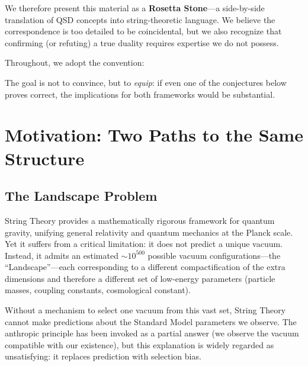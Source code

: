 \documentclass[11pt,a4paper]{article}
\theoremstyle{definition}
\begin{document}
We therefore present this material as a \textbf{Rosetta Stone}---a
side-by-side translation of QSD concepts into string-theoretic language.  We
believe the correspondence is too detailed to be coincidental, but we also
recognize that confirming (or refuting) a true duality requires expertise we do
not possess.

Throughout, we adopt the convention:
\begin{center}
\end{center}

The goal is not to convince, but to \emph{equip}: if even one of the
conjectures below proves correct, the implications for both frameworks would be
substantial.


\section{Motivation: Two Paths to the Same Structure}
\label{sec:motivation}

\subsection{The Landscape Problem}

String Theory provides a mathematically rigorous framework for quantum
gravity, unifying general relativity and quantum mechanics at the Planck
scale.  Yet it suffers from a critical limitation: it does not predict a
unique vacuum.  Instead, it admits an estimated $\sim10^{500}$ possible
vacuum configurations---the ``Landscape''---each corresponding to a
different compactification of the extra dimensions and therefore a
different set of low-energy parameters (particle masses, coupling
constants, cosmological constant).

Without a mechanism to select one vacuum from this vast set, String Theory
cannot make predictions about the Standard Model parameters we observe.
The anthropic principle has been invoked as a partial answer (we observe
the vacuum compatible with our existence), but this explanation is widely
regarded as unsatisfying: it replaces prediction with selection bias.
\end{document}
